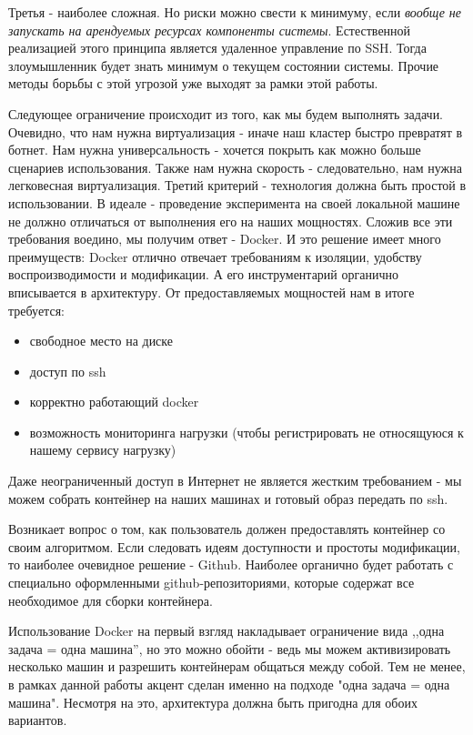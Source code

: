 Третья - наиболее сложная. Но риски можно свести к минимуму, если \textit{вообще не запускать на арендуемых ресурсах компоненты системы}. Естественной реализацией этого принципа является удаленное управление по SSH. Тогда злоумышленник будет знать минимум о текущем состоянии системы. Прочие методы борьбы с этой угрозой уже выходят за рамки этой работы.

Следующее ограничение происходит из того, как мы будем выполнять задачи. Очевидно, что нам нужна виртуализация - иначе наш кластер быстро превратят в ботнет. Нам нужна универсальность - хочется покрыть как можно больше сценариев использования. Также нам нужна скорость - следовательно, нам нужна легковесная виртуализация. Третий критерий - технология должна быть простой в использовании. В идеале - проведение эксперимента на своей локальной машине не должно отличаться от выполнения его на наших мощностях. Сложив все эти требования воедино, мы получим ответ - Docker. И это решение имеет много преимуществ: Docker отлично отвечает требованиям к изоляции, удобству воспроизводимости и модификации. А его инструментарий органично вписывается в архитектуру. От предоставляемых мощностей нам в итоге требуется:

\begin{itemize}
	\item свободное место на диске
	\item доступ по ssh
	\item корректно работающий docker
	\item возможность мониторинга нагрузки (чтобы регистрировать не относящуюся к нашему сервису нагрузку)
\end{itemize}

Даже неограниченный доступ в Интернет не является жестким требованием - мы можем собрать контейнер на наших машинах и готовый образ передать по ssh.

Возникает вопрос о том, как пользователь должен предоставлять контейнер со своим алгоритмом. Если следовать идеям доступности и простоты модификации, то наиболее очевидное решение - Github. Наиболее органично будет работать с специально оформленными github-репозиториями, которые содержат все необходимое для сборки контейнера.

Использование Docker на первый взгляд накладывает ограничение вида ,,одна задача = одна машина'', но это можно обойти - ведь мы можем активизировать несколько машин и разрешить контейнерам общаться между собой. Тем не менее, в рамках данной работы акцент сделан именно на подходе "одна задача = одна машина". Несмотря на это, архитектура должна быть пригодна для обоих вариантов.

